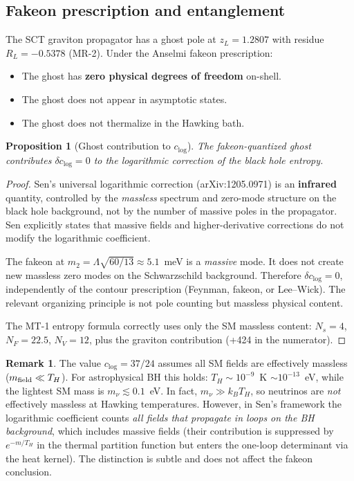 \documentclass[11pt,a4paper]{article}
\theoremstyle{plain}
\newtheorem{proposition}[theorem]{Proposition}
\theoremstyle{definition}
\newtheorem{remark}[theorem]{Remark}
\begin{document}
\subsection{Fakeon prescription and entanglement}

The SCT graviton propagator has a ghost pole at
$z_L = 1.2807$ with residue $R_L = -0.5378$ (MR-2).
Under the Anselmi fakeon prescription:
\begin{itemize}
\item The ghost has \textbf{zero physical degrees of freedom} on-shell.
\item The ghost does not appear in asymptotic states.
\item The ghost does not thermalize in the Hawking bath.
\end{itemize}

\begin{proposition}[Ghost contribution to $c_{\log}$]
\label{prop:ghost-clog}
The fakeon-quantized ghost contributes $\delta c_{\log} = 0$
to the logarithmic correction of the black hole entropy.
\end{proposition}

\begin{proof}
Sen's universal logarithmic correction (arXiv:1205.0971) is an
\textbf{infrared} quantity, controlled by the \emph{massless} spectrum
and zero-mode structure on the black hole background, not by the number
of massive poles in the propagator.  Sen explicitly states that massive
fields and higher-derivative corrections do not modify the logarithmic
coefficient.

The fakeon at $m_2 = \Lambda\sqrt{60/13} \approx 5.1$~meV is a
\emph{massive} mode.  It does not create new massless zero modes on
the Schwarzschild background.  Therefore $\delta c_{\log} = 0$,
independently of the contour prescription (Feynman, fakeon, or
Lee--Wick).  The relevant organizing principle is not pole counting but
massless physical content.

The MT-1 entropy formula correctly uses only the SM massless content:
$N_s = 4$, $N_F = 22.5$, $N_V = 12$, plus the graviton contribution
(+424 in the numerator).
\end{proof}

\begin{remark}
The value $c_{\log} = 37/24$ assumes all SM fields are effectively
massless ($m_{\rm field} \ll T_H$).  For astrophysical BH this holds:
$T_H \sim 10^{-9}$~K $\sim 10^{-13}$~eV, while the lightest SM mass
is $m_\nu \lesssim 0.1$~eV.  In fact, $m_\nu \gg k_B T_H$, so
neutrinos are \emph{not} effectively massless at Hawking temperatures.
However, in Sen's framework the logarithmic coefficient counts
\emph{all fields that propagate in loops on the BH background},
which includes massive fields (their contribution is suppressed by
$e^{-m/T_H}$ in the thermal partition function but enters the
one-loop determinant via the heat kernel).  The distinction is subtle
and does not affect the fakeon conclusion.
\end{remark}
\end{document}
